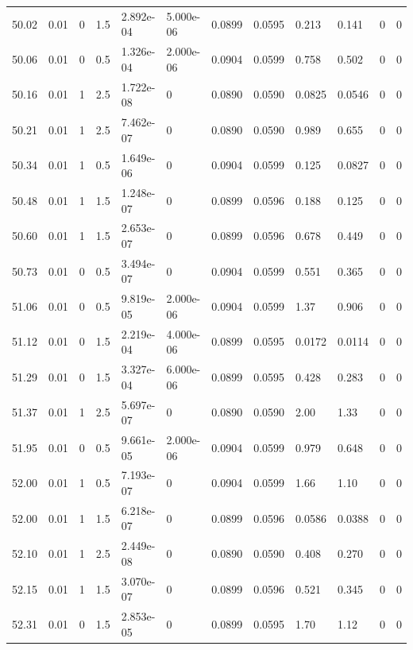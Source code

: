 \documentclass[preview]{standalone}
\begin{document}
{{{{{{{{{{\begin{tabular}{L{1.2cm}C{1.2cm} C{0.3cm}C{0.5cm} C{1.4cm}C{1.4cm} C{1.4cm}C{1.4cm} C{1.6cm}C{1.6cm} C{1.6cm}C{1.6cm}}
  50.02  &  0.01  & 0     & 1.5 &  2.892e-04  & 5.000e-06  &  0.0899&   0.0595& 0.213 & 0.141   &  0 & 0  \\ 
  50.06  &  0.01  & 0     & 0.5 &  1.326e-04  & 2.000e-06  &  0.0904&   0.0599& 0.758 & 0.502   &  0 & 0  \\ 
  50.16  &  0.01  & 1     & 2.5 &  1.722e-08  & 0  &  0.0890&   0.0590& 0.0825 & 0.0546   &  0 & 0  \\ 
  50.21  &  0.01  & 1     & 2.5 &  7.462e-07  & 0  &  0.0890&   0.0590& 0.989 & 0.655   &  0 & 0  \\ 
  50.34  &  0.01  & 1     & 0.5 &  1.649e-06  & 0  &  0.0904&   0.0599& 0.125 & 0.0827   &  0 & 0  \\ 
  50.48  &  0.01  & 1     & 1.5 &  1.248e-07  & 0  &  0.0899&   0.0596& 0.188 & 0.125   &  0 & 0  \\ 
  50.60  &  0.01  & 1     & 1.5 &  2.653e-07  & 0  &  0.0899&   0.0596& 0.678 & 0.449   &  0 & 0  \\ 
  50.73  &  0.01  & 0     & 0.5 &  3.494e-07  & 0  &  0.0904&   0.0599& 0.551 & 0.365   &  0 & 0  \\ 
  51.06  &  0.01  & 0     & 0.5 &  9.819e-05  & 2.000e-06  &  0.0904&   0.0599& 1.37 & 0.906   &  0 & 0  \\ 
  51.12  &  0.01  & 0     & 1.5 &  2.219e-04  & 4.000e-06  &  0.0899&   0.0595& 0.0172 & 0.0114   &  0 & 0  \\ 
  51.29  &  0.01  & 0     & 1.5 &  3.327e-04  & 6.000e-06  &  0.0899&   0.0595& 0.428 & 0.283   &  0 & 0  \\ 
  51.37  &  0.01  & 1     & 2.5 &  5.697e-07  & 0  &  0.0890&   0.0590& 2.00 & 1.33   &  0 & 0  \\ 
  51.95  &  0.01  & 0     & 0.5 &  9.661e-05  & 2.000e-06  &  0.0904&   0.0599& 0.979 & 0.648   &  0 & 0  \\ 
  52.00  &  0.01  & 1     & 0.5 &  7.193e-07  & 0  &  0.0904&   0.0599& 1.66 & 1.10   &  0 & 0  \\ 
  52.00  &  0.01  & 1     & 1.5 &  6.218e-07  & 0  &  0.0899&   0.0596& 0.0586 & 0.0388   &  0 & 0  \\ 
  52.10  &  0.01  & 1     & 2.5 &  2.449e-08  & 0  &  0.0890&   0.0590& 0.408 & 0.270   &  0 & 0  \\ 
  52.15  &  0.01  & 1     & 1.5 &  3.070e-07  & 0  &  0.0899&   0.0596& 0.521 & 0.345   &  0 & 0  \\ 
  52.31  &  0.01  & 0     & 1.5 &  2.853e-05  & 0  &  0.0899&   0.0595& 1.70 & 1.12   &  0 & 0  \\ 

\end{tabular}}}}}}}}}}}
\end{document}
